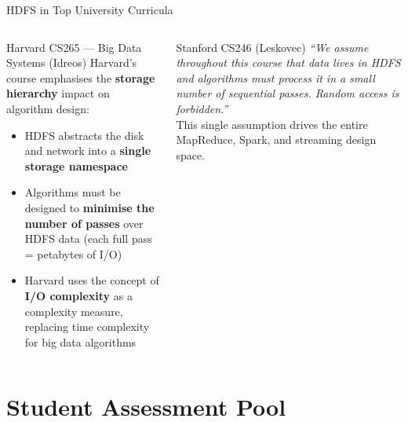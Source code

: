 \documentclass[aspectratio=169,10pt]{beamer}
\begin{document}
\begin{frame}{HDFS in Top University Curricula}
\begin{columns}[T]
      \begin{exampleblock}{Harvard CS265 — Big Data Systems (Idreos)}
        \small Harvard's course emphasises the \textbf{storage hierarchy} impact on algorithm design:
        \vspace{4pt}
        \begin{itemize}
          \item HDFS abstracts the disk and network into a \textbf{single storage namespace}
          \item Algorithms must be designed to \textbf{minimise the number of passes} over HDFS data (each full pass = petabytes of I/O)
          \item Harvard uses the concept of \textbf{I/O complexity} as a complexity measure, replacing time complexity for big data algorithms
        \end{itemize}
      \end{exampleblock}
      \vspace{4pt}
      \begin{alertblock}{Stanford CS246 (Leskovec)}
        \textit{``We assume throughout this course that data lives in HDFS and algorithms must process it in a small number of sequential passes.  Random access is forbidden.''}\\[4pt]
        This single assumption drives the entire MapReduce, Spark, and streaming design space.
      \end{alertblock}
  \end{columns}
\end{frame}

\section{Student Assessment Pool}
\end{document}
